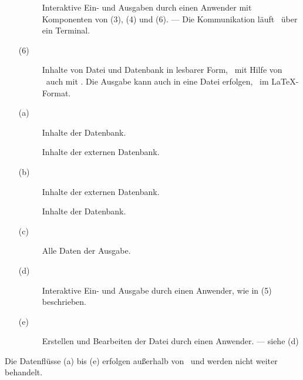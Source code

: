\begin{itemize}
\begin{description}
		\item[]\label{dat:mitAnwender}
		Interaktive Ein- und Ausgaben durch einen Anwender mit Komponenten von (3), (4) und (6).
		--- Die Kommunikation läuft \textiAlg\ über ein Terminal.
	\end{description}
	\item[(6)]\label{dat:Ausgabe}
	\begin{description}
		\item[]\label{dat:inAusgabe}
		Inhalte von Datei und Datenbank in lesbarer Form, \textua\ mit Hilfe von \Ausgabeschemata\ auch mit \Formeln.
		Die Ausgabe kann auch in eine Datei erfolgen,
		\textzB\ im \LaTeX-Format.
	\end{description}
	\item[(a)]\label{dat:extInternet}
	\begin{description}
		\item[]\label{dat:ausextInternet}
		Inhalte der Datenbank.
		\item[]\label{dat:inextInternet}
		Inhalte der externen Datenbank.
	\end{description}
	\item[(b)]\label{dat:extDatenbank}
	\begin{description}
		\item[]
		\label{dat:ausextDatenbank} Inhalte der externen Datenbank.
		\item[]
		\label{dat:inextDatenbank} Inhalte der Datenbank.
	\end{description}
	\item[(c)]\label{dat:AusgabeAnwender}
	\begin{description}
		\item[]\label{dat:Ausgabe2Anwender}
		Alle Daten der Ausgabe.
	\end{description}
	\item[(d)] \label{dat:AnwenderTerminal}
	\begin{description}
		\item[]\label{dat:Anwender22Terminal}
		Interaktive Ein- und Ausgabe durch einen Anwender, wie in (5) beschrieben.
	\end{description}
	\item[(e)] \label{dat:TerminalDatei}
	\begin{description}
		\item[]\label{dat:Terminal22Datei}
		Erstellen und Bearbeiten der Datei durch einen Anwender.
		--- siehe (d)
	\end{description}
\end{itemize}
Die Datenflüsse (a) bis (e) erfolgen außerhalb von \ASBA\ und werden nicht weiter behandelt.


